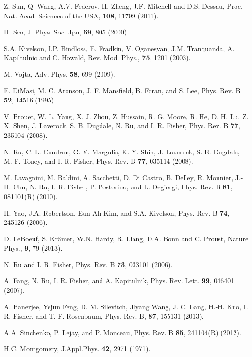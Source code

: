 \begin{thebibliography}{99}

Z. Sun, Q. Wang, A.V. Federov, H. Zheng, J.F. Mitchell and D.S.
Dessau, Proc. Nat. Acad. Sciences of the USA, \textbf{108}, 11799
(2011).

H. Seo, J. Phys. Soc. Jpn, \textbf{69}, 805 (2000).

S.A. Kivelson, I.P. Bindloss, E. Fradkin, V. Oganesyan, J.M.
Tranquanda, A. Kapiltulnic and C. Howald, Rev. Mod. Phys.,
\textbf{75}, 1201 (2003).

M. Vojta, Adv. Phys, \textbf{58}, 699 (2009).

 E. DiMasi, M. C. Aronson, J. F. Mansfield, B. Foran, and
S. Lee, Phys. Rev. B \textbf{52}, 14516 (1995).

 V. Brouet, W. L. Yang, X. J. Zhou, Z. Hussain, R. G.
Moore, R. He, D. H. Lu, Z. X. Shen, J. Laverock, S. B. Dugdale, N.
Ru, and I. R. Fisher, Phys. Rev. B \textbf{77}, 235104 (2008).

 N. Ru, C. L. Condron, G. Y. Margulis, K. Y. Shin, J.
Laverock, S. B. Dugdale, M. F. Toney, and I. R. Fisher, Phys. Rev. B \textbf{
77}, 035114 (2008).

 M. Lavagnini, M. Baldini, A. Sacchetti, D. Di Castro,
B. Delley, R. Monnier, J.-H. Chu, N. Ru, I. R. Fisher, P. Postorino,
and L. Degiorgi, Phys. Rev. B \textbf{81}, 081101(R) (2010).

 H. Yao, J.A. Robertson, Eun-Ah Kim, and S.A. Kivelson, Phys.
Rev. B \textbf{74}, 245126 (2006).

D. LeBoeuf, S. Kr\"{a}mer, W.N. Hardy, R. Liang, D.A. Bonn and C.
Proust, Nature Phys., \textbf{9}, 79 (2013).

 N. Ru and I. R. Fisher, Phys. Rev. B \textbf{73}, 033101
(2006).

 A. Fang, N. Ru, I. R. Fisher, and A. Kapitulnik, Phys. Rev.
Lett. \textbf{99}, 046401 (2007).

 A. Banerjee, Yejun Feng, D. M. Silevitch, Jiyang Wang, J. C.
Lang, H.-H. Kuo, I. R. Fisher, and T. F. Rosenbaum, Phys. Rev. B,
\textbf{87}, 155131 (2013).

 A.A. Sinchenko, P. Lejay, and P. Monceau, Phys. Rev. B
\textbf{85}, 241104(R) (2012).

 H.C. Montgomery, J.Appl.Phys. \textbf{42}, 2971
(1971).


\end{thebibliography}
